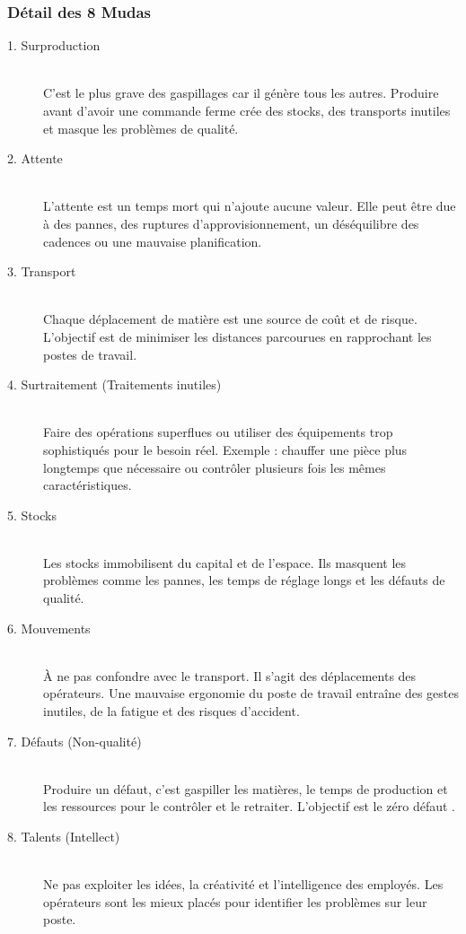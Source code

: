 \documentclass[a4paper,12pt]{article}
\begin{document}
\subsubsection{Détail des 8 Mudas}

\begin{description}
    \item[1. Surproduction] \hfill \\
    C'est le plus grave des gaspillages car il génère tous les autres. Produire avant d'avoir une commande ferme crée des stocks, des transports inutiles et masque les problèmes de qualité.
    
    \item[2. Attente] \hfill \\
    L'attente est un temps mort qui n'ajoute aucune valeur. Elle peut être due à des pannes, des ruptures d'approvisionnement, un déséquilibre des cadences ou une mauvaise planification.
    
    \item[3. Transport] \hfill \\
    Chaque déplacement de matière est une source de coût et de risque. L'objectif est de minimiser les distances parcourues en rapprochant les postes de travail.
    
    \item[4. Surtraitement (Traitements inutiles)] \hfill \\
    Faire des opérations superflues ou utiliser des équipements trop sophistiqués pour le besoin réel. Exemple : chauffer une pièce plus longtemps que nécessaire ou contrôler plusieurs fois les mêmes caractéristiques.
    
    \item[5. Stocks] \hfill \\
    Les stocks immobilisent du capital et de l'espace. Ils masquent les problèmes comme les pannes, les temps de réglage longs et les défauts de qualité.
    
    \item[6. Mouvements] \hfill \\
    À ne pas confondre avec le transport. Il s'agit des déplacements des opérateurs. Une mauvaise ergonomie du poste de travail entraîne des gestes inutiles, de la fatigue et des risques d'accident.
    
    \item[7. Défauts (Non-qualité)] \hfill \\
    Produire un défaut, c'est gaspiller les matières, le temps de production et les ressources pour le contrôler et le retraiter. L'objectif est le \og zéro défaut \fg.
    
    \item[8. Talents (Intellect)] \hfill \\
    Ne pas exploiter les idées, la créativité et l'intelligence des employés. Les opérateurs sont les mieux placés pour identifier les problèmes sur leur poste.
\end{description}
\end{document}
